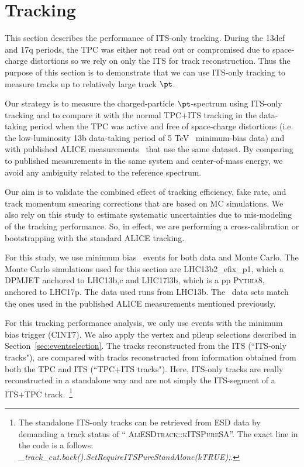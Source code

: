\section{Tracking}
\label{sec:tracking}
This section describes the performance of ITS-only tracking. During the 13def and 17q periods, the TPC was either not read out or compromised due to space-charge distortions so we rely on only the ITS for track reconstruction. Thus the purpose of this section is to demonstrate that we can use ITS-only tracking to measure tracks up to relatively large track $\pt$.

Our strategy is to measure the charged-particle $\pt$-spectrum using ITS-only tracking and to compare it with the normal TPC+ITS tracking in the data-taking period when the TPC was active and free of space-charge distortions (i.e. the low-luminosity 13b data-taking period of 5 TeV \pPb~minimum-bias data) and with published ALICE measurements~\cite{Acharya:2018qsh} that use the same dataset. By comparing to published measurements in the same system and center-of-mass energy, we avoid any ambiguity related to the reference spectrum. 

Our aim is to validate the combined effect of tracking efficiency, fake rate, and track momentum smearing corrections that are based on MC simulations. We also rely on this study to estimate systematic uncertainties due to mis-modeling of the tracking performance. So, in effect, we are performing a cross-calibration or bootstrapping with the standard ALICE tracking.

For this study, we use minimum bias \pPb~events for both data and Monte Carlo. The Monte Carlo simulations used for this section are LHC13b2\_efix\_p1, which a \textsc{DPMJET} anchored to LHC13b,c and LHC17l3b, which is a pp \textsc{Pythia8}, anchored to LHC17p. The data used runs from LHC13b. The \pPb~data sets match the ones used in the published ALICE measurements mentioned previously. 

For this tracking performance analysis, we  only use events with the minimum bias trigger (CINT7). We also apply the vertex and pileup selections described in Section~\ref{sec:eventselection}. The tracks reconstructed from the ITS (``ITS-only tracks"), are compared with tracks reconstructed from information obtained from both the TPC and ITS (``TPC+ITS tracks"). Here, ITS-only tracks are really reconstructed in a standalone way and are not simply the ITS-segment of a ITS+TPC track.~\footnote{The standalone ITS-only tracks can be retrieved from ESD data by demanding a track status of `` \textsc{AliESDtrack::kITSPureSA}''. The exact line in the code is a follows: \textit{        \_track\_cut.back().SetRequireITSPureStandAlone(kTRUE);}.}

